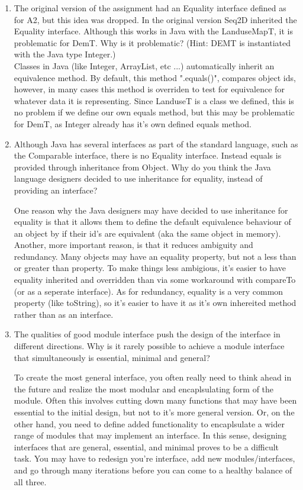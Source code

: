 \documentclass[12pt]{article}
\begin{document}
\begin{enumerate}
\item The original version of the assignment had an Equality interface defined
  as for A2, but this idea was dropped.  In the original version Seq2D inherited
  the Equality interface.  Although this works in Java with the LanduseMapT, it is
  problematic for DemT.  Why is it problematic?  (Hint: DEMT is instantiated
  with the Java type Integer.)\\

  Classes in Java (like Integer, ArrayList, etc ...) automatically inherit an equivalence method.
  By default, this method ".equals()", compares object ids, however, in many cases this method is overriden to test for equivalence for
  whatever data it is representing. Since LanduseT is a class we defined, this is no problem if we define our own equals method,
  but this may be problematic for DemT, as Integer already has it's own defined equals method.

\item Although Java has several interfaces as part of the standard language,
  such as the Comparable interface, there is no Equality interface.  Instead
  equals is provided through inheritance from Object.  Why do you think the
  Java language designers decided to use inheritance for equality, instead of
  providing an interface?

  One reason why the Java designers may have decided to use inheritance for equality is that
  it allows them to define the default equivalence behaviour of an object by if their id's are equivalent (aka the same object in memory).
  Another, more important reason, is that it reduces ambiguity and redundancy.
  Many objects may have an equality property, but not a less than or greater than property. To make
  things less ambigious, it's easier to have equality inherited and overridden than via some workaround
  with compareTo (or as a seperate interface). As for redundancy, equality is a very common property (like toString),
  so it's easier to have it as it's own inhereited method rather than as an interface.

\item The qualities of good module interface push the design of the interface in
  different directions. Why is it rarely possible to achieve a module interface
  that simultaneously is essential, minimal and general?

  To create the most general interface, you often really need to think ahead in the future
  and realize the most modular and encaplsulating form of the module. Often this involves cutting
  down many functions that may have been essential to the initial design, but not to it's
  more general version. Or, on the other hand, you need to define added functionality to
  encaplsulate a wider range of modules that may implement an interface. In this sense, designing
  interfaces that are general, essential, and minimal proves to be a difficult task. You may
  have to redesign you're interface, add new modules/interfaces, and go through many iterations
  before you can come to a healthy balance of all three.

\end{enumerate}
\end{document}
